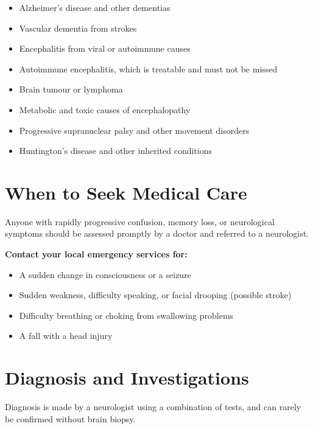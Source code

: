 \begin{itemize}
    \item Alzheimer's disease and other dementias
    \item Vascular dementia from strokes
    \item Encephalitis from viral or autoimmune causes
    \item Autoimmune encephalitis, which is treatable and must not be missed
    \item Brain tumour or lymphoma
    \item Metabolic and toxic causes of encephalopathy
    \item Progressive supranuclear palsy and other movement disorders
    \item Huntington's disease and other inherited conditions
\end{itemize}

\section*{When to Seek Medical Care}
Anyone with rapidly progressive confusion, memory loss, or neurological symptoms should be assessed promptly by a doctor and referred to a neurologist.

\textbf{Contact your local emergency services for:}
\begin{itemize}
    \item A sudden change in consciousness or a seizure
    \item Sudden weakness, difficulty speaking, or facial drooping (possible stroke)
    \item Difficulty breathing or choking from swallowing problems
    \item A fall with a head injury
\end{itemize}

\section*{Diagnosis and Investigations}
Diagnosis is made by a neurologist using a combination of tests, and can rarely be confirmed without brain biopsy.

